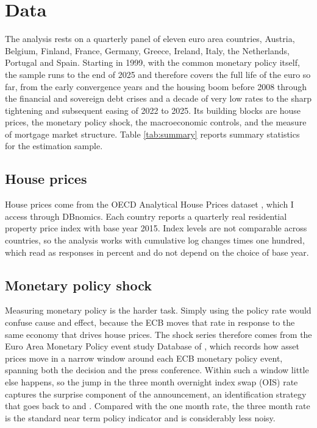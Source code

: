 \section{Data}
\label{sec:data}

The analysis rests on a quarterly panel of eleven euro area countries,
Austria, Belgium, Finland, France, Germany, Greece, Ireland, Italy, the
Netherlands, Portugal and Spain. Starting in 1999, with the common monetary
policy itself, the sample runs to the end of 2025 and therefore covers the
full life of the euro so far, from the early convergence years and the
housing boom before 2008 through the financial and sovereign debt crises
and a decade of very low rates to the sharp tightening and subsequent
easing of 2022 to 2025. Its building blocks are house prices, the monetary
policy shock, the macroeconomic controls, and the measure of mortgage
market structure.
Table \ref{tab:summary} reports summary statistics for the estimation
sample.

{\footnotesize}

\subsection{House prices}

House prices come from the OECD Analytical House Prices dataset
\citep{oecd2026}, which I access through DBnomics. Each country reports a quarterly real residential
property price index with base year 2015. Index levels are not comparable
across countries, so the analysis works with cumulative log changes
times one hundred, which read as responses in percent and do not depend on
the choice of base year.

\subsection{Monetary policy shock}

Measuring monetary policy is the harder task. Simply using the policy rate
would confuse cause and effect, because the ECB moves that rate in response
to the same economy that drives house prices. The shock series therefore
comes from the Euro Area Monetary Policy event study Database
\citep[EA-MPD,][]{ecb2026} of \citet{altavilla2019}, which records how
asset prices move in a narrow
window around each ECB monetary policy event, spanning both the decision
and the press conference. Within such a window little else happens, so the
jump in the three month overnight index swap (OIS) rate captures the
surprise component of the announcement, an identification strategy that
goes back to \citet{kuttner2001} and \citet{gurkaynak2005}. Compared with the one month rate,
the three month rate is the standard near term policy indicator and is
considerably less noisy.

